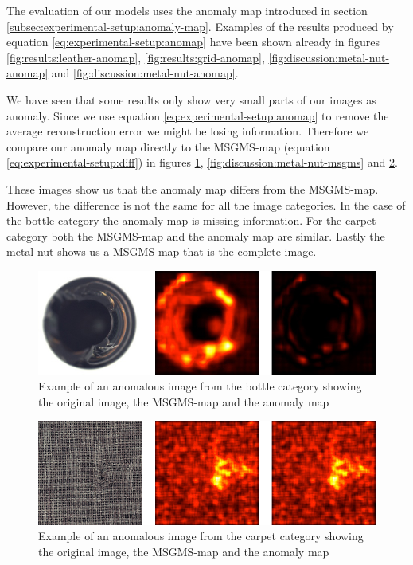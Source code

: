 The evaluation of our models uses the anomaly map introduced in section \ref{subsec:experimental-setup:anomaly-map}. Examples of the results produced by equation \ref{eq:experimental-setup:anomap} have been shown already in figures \ref{fig:results:leather-anomap}, \ref{fig:results:grid-anomap}, \ref{fig:discussion:metal-nut-anomap} and \ref{fig:discussion:metal-nut-anomap}.

We have seen that some results only show very small parts of our images as anomaly. Since we use equation \ref{eq:experimental-setup:anomap} to remove the average reconstruction error we might be losing information. Therefore we compare our anomaly map directly to the MSGMS-map (equation \ref{eq:experimental-setup:diff}) in figures \ref{fig:discussion:bottle-msgms}, \ref{fig:discussion:metal-nut-msgms} and \ref{fig:discussion:carpet-msgms}.

These images show us that the anomaly map differs from the MSGMS-map. However, the difference is not the same for all the image categories. In the case of the bottle category the anomaly map is missing information. For the carpet category both the MSGMS-map and the anomaly map are similar. Lastly the metal nut shows us a MSGMS-map that is the complete image.

\begin{figure}[ht!]
\centering
\includegraphics[width=\textwidth]{imgs/samples/bottle-ano-msgms.jpg}
\caption{Example of an anomalous image from the bottle category showing the original image, the MSGMS-map and the anomaly map}
\label{fig:discussion:bottle-msgms}
\end{figure}

\begin{figure}[ht!]
\centering
\includegraphics[width=\textwidth]{imgs/samples/carpet-ano-msgms.jpg}
\caption{Example of an anomalous image from the carpet category showing the original image, the MSGMS-map and the anomaly map}
\label{fig:discussion:carpet-msgms}
\end{figure}

